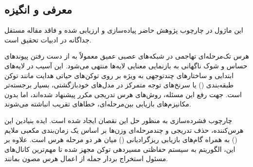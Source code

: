 \subsection{معرفی و انگیزه}
این ماژول در چارچوب پژوهش حاضر پیاده‌سازی و ارزیابی شده و فاقد مقاله مستقل جداگانه در ادبیات تحقیق است.

هرس تک‌مرحله‌ای تهاجمی در شبکه‌های عصبی عمیق معمولاً به از دست رفتن پیوندهای حساس و شوک ناگهانی به بازنمایی معنایی لایه‌ها منتهی می‌شود. این آسیب در لایه‌های ابتدایی و ساختارهای چندتوجهی به ویژه بر روی توکن‌های حیاتی هدایت مانند توکن طبقه‌بندی (\lr{[CLS]}) یا سرنخ‌های توجه متمرکز در مدل‌های خودبازگشتی، بسیار برجسته‌تر است. جهت رفع این مسئله، روش‌های هرس تدریجی مکرر پیشنهاد شده‌اند، اما بدون مکانیزم‌های بازیابی بین‌مرحله‌ای، خطاهای تقریب انباشته می‌شوند.

چارچوب فشرده‌سازی  به منظور حل این نقصان ایجاد شده است. ایده بنیادین این هرس‌کننده، حذف تدریجی و چندمرحله‌ای وزن‌ها بر اساس یک زمان‌بندی مکعبی ملایم () به همراه گام‌های بازیابی ریزگرادیانی () میان هر دو مرحله هرس است. علاوه بر این، الگوریتم به سیستم حفاظتی مسیردهی توکن \lr{[CLS]} مجهز شده تا مهم‌ترین کانال‌های مسئول استخراج بردار جمله از اعمال هرس مصون بمانند.
